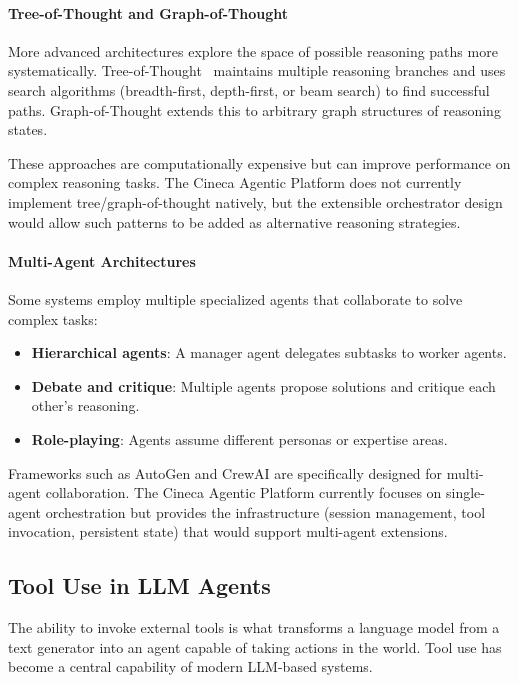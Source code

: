 \paragraph{Tree-of-Thought and Graph-of-Thought}
More advanced architectures explore the space of possible reasoning paths more systematically. Tree-of-Thought~%
maintains multiple reasoning branches and uses search algorithms (breadth-first, depth-first, or beam search) to find successful paths. Graph-of-Thought extends this to arbitrary graph structures of reasoning states.

These approaches are computationally expensive but can improve performance on complex reasoning tasks. The Cineca Agentic Platform does not currently implement tree/graph-of-thought natively, but the extensible orchestrator design would allow such patterns to be added as alternative reasoning strategies.

\paragraph{Multi-Agent Architectures}
Some systems employ multiple specialized agents that collaborate to solve complex tasks:
\begin{itemize}
    \item \textbf{Hierarchical agents}: A manager agent delegates subtasks to worker agents.
    \item \textbf{Debate and critique}: Multiple agents propose solutions and critique each other's reasoning.
    \item \textbf{Role-playing}: Agents assume different personas or expertise areas.
\end{itemize}

Frameworks such as AutoGen and CrewAI are specifically designed for multi-agent collaboration. The Cineca Agentic Platform currently focuses on single-agent orchestration but provides the infrastructure (session management, tool invocation, persistent state) that would support multi-agent extensions.

\subsection{Tool Use in LLM Agents}

The ability to invoke external tools is what transforms a language model from a text generator into an agent capable of taking actions in the world. Tool use has become a central capability of modern LLM-based systems.

